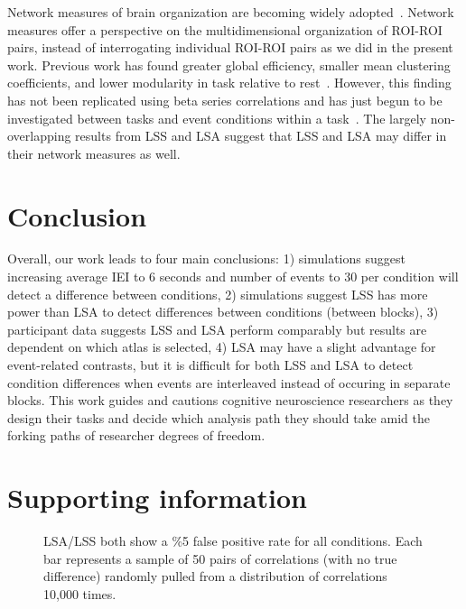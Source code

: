 \documentclass[phd,appendix,figures]{uithesis}
\begin{document}
Network measures of brain organization are becoming widely adopted~\cite{Rubinov2010}.
Network measures offer a perspective on the multidimensional organization of ROI-ROI pairs, instead of
interrogating individual ROI-ROI pairs as we did in the present work.
Previous work has found greater global efficiency, smaller mean clustering coefficients, and lower modularity in
task relative to rest~\cite{Di2013}.
However, this finding has not been replicated using beta series correlations and has just begun
to be investigated between tasks and event conditions within a task~\cite{Di2019a}.
The largely non-overlapping results from LSS and LSA suggest that LSS and LSA may differ
in their network measures as well.

\section*{Conclusion}

Overall, our work leads to four main conclusions:
1) simulations suggest increasing average IEI to 6 seconds and number of events to 30 per condition will detect a difference between conditions, 
2) simulations suggest LSS has more power than LSA to detect differences between conditions (between blocks),
3) participant data suggests LSS and LSA perform comparably but results are dependent on which atlas is selected,
4) LSA may have a slight advantage for event-related contrasts,
but it is difficult for both LSS and LSA to detect condition differences when events are interleaved instead of occuring in separate blocks.
This work guides and cautions cognitive neuroscience researchers as they design their tasks and decide
which analysis path they should take amid the forking paths of researcher degrees of freedom.

\section*{Supporting information}

\begin{figure}[H]
  \centering


  \caption{
    LSA/LSS both show a \%5 false positive rate for all conditions.
    Each bar represents a sample of 50 pairs of correlations (with no true difference)
    randomly pulled from a distribution of correlations 10,000 times.
  }
  \label{fig:res_sim_fpr}
\end{figure}
\end{document}

